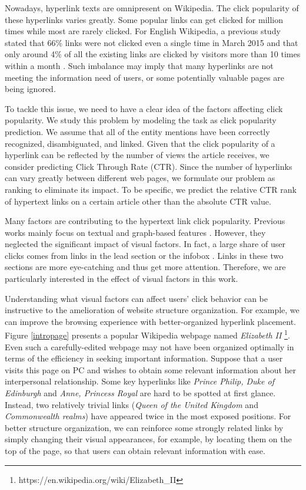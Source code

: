 Nowadays, hyperlink texts are omnipresent on Wikipedia. The click popularity of these hyperlinks varies greatly. Some popular links can get clicked for million times while most are rarely clicked. For English Wikipedia, a previous study \cite{paranjape2016improving} stated that 66\% links were not clicked even a single time in March 2015 and that only around 4\% of all the existing links are clicked by visitors more than 10 times within a month \cite{dimitrov2017makes}. Such imbalance may imply that many hyperlinks are not meeting the information need of users, or some potentially valuable pages are being ignored.

To tackle this issue, we need to have a clear idea of the factors affecting click popularity. We study this problem by modeling the task as click popularity prediction. We assume that all of the entity mentions have been correctly recognized, disambiguated, and linked. Given that the click popularity of a hyperlink can be reflected by the number of views the article receives, we consider predicting Click Through Rate (CTR). Since the number of hyperlinks can vary greatly between different web pages, we formulate our problem as ranking to eliminate its impact. To be specific, we predict the relative CTR rank of hypertext links on a certain article other than the absolute CTR value.

Many factors are contributing to the hypertext link click popularity. Previous works mainly focus on textual and graph-based features \cite{thruesen2016link, yamada2018linkify}. However, they neglected the significant impact of visual factors. In fact, a large share of user clicks comes from links in the lead section or the infobox \cite{lamprecht2017structure}. Links in these two sections are more eye-catching and thus get more attention. Therefore, we are particularly interested in the effect of visual factors in this work. 

Understanding what visual factors can affect users' click behavior can be instructive to the amelioration of website structure organization. For example, we can improve the browsing experience with better-organized hyperlink placement. Figure \ref{intropage} presents a popular Wikipedia webpage named \emph{Elizabeth II} \footnote{https://en.wikipedia.org/wiki/Elizabeth\_II}. Even such a carefully-edited webpage may not have been organized optimally in terms of the efficiency in seeking important information. Suppose that a user visits this page on PC and wishes to obtain some relevant information about her interpersonal relationship. Some key hyperlinks like \emph{Prince Philip, Duke of Edinburgh} and \emph{Anne, Princess Royal} are hard to be spotted at first glance. Instead, two relatively trivial links (\emph{Queen of the United Kingdom} and \emph{Commonwealth realms}) have appeared twice in the most exposed positions. For better structure organization, we can reinforce some strongly related links by simply changing their visual appearances, for example, by locating them on the top of the page, so that users can obtain relevant information with ease. 


